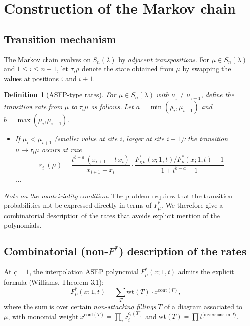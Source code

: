 \documentclass[12pt]{article}
\newtheorem{definition}[theorem]{Definition}
\begin{document}
\section*{Construction of the Markov chain}

\subsection*{Transition mechanism}

The Markov chain evolves on $S_n(\lambda)$ by \emph{adjacent transpositions}.  For $\mu \in S_n(\lambda)$ and $1 \leq i \leq n-1$, let $\tau_i\mu$ denote the state obtained from $\mu$ by swapping the values at positions $i$ and $i+1$.

\begin{definition}[ASEP-type rates]
  For $\mu \in S_n(\lambda)$ with $\mu_i \neq \mu_{i+1}$, define the transition rate from $\mu$ to $\tau_i\mu$ as follows.  Let $a = \min(\mu_i,\mu_{i+1})$ and $b = \max(\mu_i,\mu_{i+1})$.
  \begin{itemize}
    \item If $\mu_i < \mu_{i+1}$ (smaller value at site $i$, larger at site $i+1$): the transition $\mu \to \tau_i\mu$ occurs at rate
    \[
      r^+_i(\mu) = \frac{t^{b-a}\,(x_{i+1} - t\,x_i)}{x_{i+1} - x_i}\cdot\frac{F^*_{\tau_i\mu}(x;1,t)/F^*_\mu(x;1,t) - 1}{1 + t^{b-a}-1}
    \]
    ...
  \end{itemize}
\end{definition}

\medskip
\noindent\textit{Note on the nontriviality condition.} The problem requires that the transition probabilities not be expressed directly in terms of $F^*_\mu$.  We therefore give a combinatorial description of the rates that avoids explicit mention of the polynomials.

\subsection*{Combinatorial (non-$F^*$) description of the rates}

At $q=1$, the interpolation ASEP polynomial $F^*_\mu(x;1,t)$ admits the explicit formula (Williams, Theorem 3.1):
\[
  F^*_\mu(x;1,t) = \sum_{T} \mathrm{wt}(T)\cdot x^{\mathrm{cont}(T)},
\]
where the sum is over certain \emph{non-attacking fillings} $T$ of a diagram associated to $\mu$, with monomial weight $x^{\mathrm{cont}(T)} = \prod_i x_i^{c_i(T)}$ and $\mathrm{wt}(T) = \prod t^{\text{(inversions in }T)}$.
\end{document}
